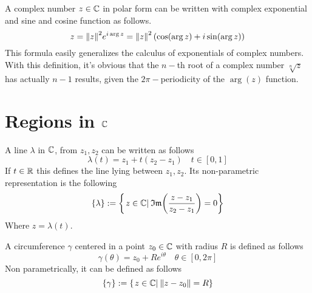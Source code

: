 \documentclass[../complete.tex]{subfiles}
\begin{document}
\begin{thm}
	A complex number $z\in\mathbb{C}$ in polar form can be written with complex exponential and sine and cosine function as follows.
	\begin{equation}
		z=\norm{z}^2e^{i\arg{z}}=\norm{z}^2\left( \cos(\arg{z})+i\sin(\arg{z}) \right)
		\label{eq:demoivreformula}
	\end{equation}
	This formula easily generalizes the calculus of exponentials of complex numbers. With this definition, it's obvious that the $n-$th root of a complex number $\sqrt[n]{z}$ has actually $n-1$ results, given the $2\pi-$periodicity of the $\arg(z)$ function.
\end{thm}
\section{Regions in $\mathbb{C}$}
\begin{dfn}[Line]
	A line $\lambda$ in $\mathbb{C}$, from $z_1,z_2$ can be written as follows
	\begin{equation}
		\lambda(t)=z_1+t(z_2-z_1)\quad t\in[0,1]
		\label{eq:linecomplex}
	\end{equation}
	If $t\in\mathbb{R}$ this defines the line lying between $z_1,z_2$. Its non-parametric representation is the following
	\begin{equation}
		\{\lambda\}:=\left\{ \left.z\in\mathbb{C}\right|_{}\mathfrak{Im}{\left( \frac{z-z_1}{z_2-z_1} \right)}=0 \right\}
		\label{eq:lineinfcompnp}
	\end{equation}
	Where $z=\lambda(t)$.
\end{dfn}
\begin{dfn}[Circumference]
	A circumference $\gamma$ centered in a point $z_0\in\mathbb{C}$ with radius $R$ is defined as follows
	\begin{equation}
		\gamma(\theta)=z_0+Re^{i\theta}\quad\theta\in[0,2\pi]
		\label{eq:circparam}
	\end{equation}
	Non parametrically, it can be defined as follows
	\begin{equation}
		\{\gamma\}:=\left\{ \left.z\in\mathbb{C}\right|_{}\norm{z-z_0}=R \right\}
		\label{eq:circlecomplexnp}
	\end{equation}
\end{dfn}
\end{document}
